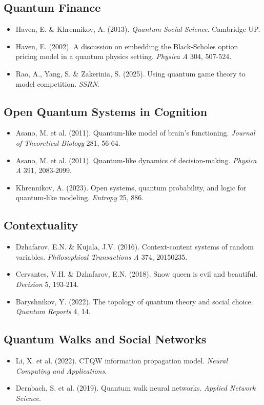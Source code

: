 \documentclass[11pt]{article}
\begin{document}
\subsection{Quantum Finance}
\label{sec:orgddb1e43}
\begin{itemize}
\item Haven, E. \& Khrennikov, A. (2013). \emph{Quantum Social Science}. Cambridge UP.
\item Haven, E. (2002). A discussion on embedding the Black-Scholes option pricing model in a quantum physics setting. \emph{Physica A} 304, 507-524.
\item Rao, A., Yang, S. \& Zakerinia, S. (2025). Using quantum game theory to model competition. \emph{SSRN}.
\end{itemize}
\subsection{Open Quantum Systems in Cognition}
\label{sec:org0e8611a}
\begin{itemize}
\item Asano, M. et al. (2011). Quantum-like model of brain's functioning. \emph{Journal of Theoretical Biology} 281, 56-64.
\item Asano, M. et al. (2011). Quantum-like dynamics of decision-making. \emph{Physica A} 391, 2083-2099.
\item Khrennikov, A. (2023). Open systems, quantum probability, and logic for quantum-like modeling. \emph{Entropy} 25, 886.
\end{itemize}
\subsection{Contextuality}
\label{sec:orge5a72cb}
\begin{itemize}
\item Dzhafarov, E.N. \& Kujala, J.V. (2016). Context-content systems of random variables. \emph{Philosophical Transactions A} 374, 20150235.
\item Cervantes, V.H. \& Dzhafarov, E.N. (2018). Snow queen is evil and beautiful. \emph{Decision} 5, 193-214.
\item Baryshnikov, Y. (2022). The topology of quantum theory and social choice. \emph{Quantum Reports} 4, 14.
\end{itemize}
\subsection{Quantum Walks and Social Networks}
\label{sec:org14df466}
\begin{itemize}
\item Li, X. et al. (2022). CTQW information propagation model. \emph{Neural Computing and Applications}.
\item Dernbach, S. et al. (2019). Quantum walk neural networks. \emph{Applied Network Science}.
\end{itemize}
\end{document}
